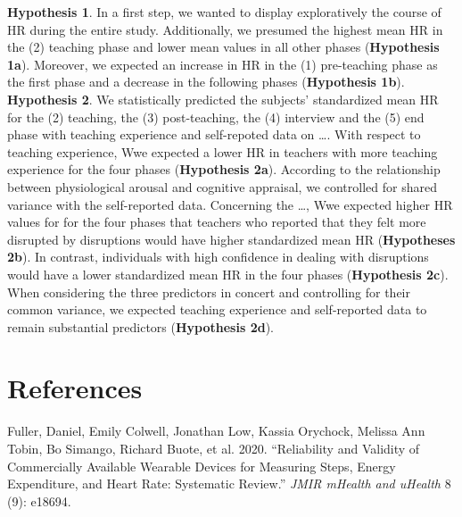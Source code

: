 \documentclass[preprint, 3p,
authoryear]{elsarticle} %
\newlength{\cslhangindent}
\newlength{\cslentryspacingunit} %
\newenvironment{CSLReferences}[2] %
 {%
  \setlength{\parindent}{0pt}
  \ifodd #1
  \let\oldpar\par
  \def\par{\hangindent=\cslhangindent\oldpar}
  \fi
  \setlength{\parskip}{#2\cslentryspacingunit}
 }%
 {}
\begin{document}
\textbf{Hypothesis 1}. In a first step, we wanted to display
exploratively the course of HR during the entire study. Additionally, we
presumed the highest mean HR in the (2) teaching phase and lower mean
values in all other phases (\textbf{Hypothesis 1a}). Moreover, we
expected an increase in HR in the (1) pre-teaching phase as the first
phase and a decrease in the following phases (\textbf{Hypothesis 1b}).
\textbf{Hypothesis 2}. We statistically predicted the subjects'
standardized mean HR for the (2) teaching, the (3) post-teaching, the
(4) interview and the (5) end phase with teaching experience and
self-repoted data on \ldots. With respect to teaching experience, Wwe
expected a lower HR in teachers with more teaching experience for the
four phases (\textbf{Hypothesis 2a}). According to the relationship
between physiological arousal and cognitive appraisal, we controlled for
shared variance with the self-reported data. Concerning the \ldots, Wwe
expected higher HR values for for the four phases that teachers who
reported that they felt more disrupted by disruptions would have higher
standardized mean HR (\textbf{Hypotheses 2b}). In contrast, individuals
with high confidence in dealing with disruptions would have a lower
standardized mean HR in the four phases (\textbf{Hypothesis 2c}). When
considering the three predictors in concert and controlling for their
common variance, we expected teaching experience and self-reported data
to remain substantial predictors (\textbf{Hypothesis 2d}).

\hypertarget{references}{%
\section*{References}\label{references}}

\hypertarget{refs}{}
\begin{CSLReferences}{1}{0}
\leavevmode{}%
Fuller, Daniel, Emily Colwell, Jonathan Low, Kassia Orychock, Melissa
Ann Tobin, Bo Simango, Richard Buote, et al. 2020. {``Reliability and
Validity of Commercially Available Wearable Devices for Measuring Steps,
Energy Expenditure, and Heart Rate: Systematic Review.''} \emph{JMIR
mHealth and uHealth} 8 (9): e18694.

\end{CSLReferences}
\end{document}
